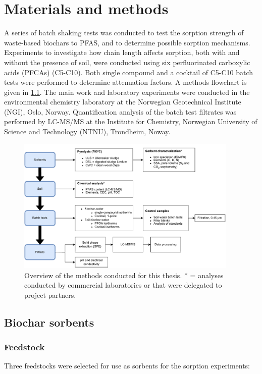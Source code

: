\chapter{Materials and methods}\label{chap:MatlsMethds}
A series of batch shaking tests was conducted to test the sorption strength of waste-based biochars to PFAS, and to determine possible sorption mechanisms. Experiments to investigate how chain length affects sorption, both with and without the presence of soil, were conducted using six perfluorinated carboxylic acids (PFCAs) (C5-C10). Both single compound and a cocktail of C5-C10 batch tests were performed to determine attenuation factors. A methods flowchart is given in \cref{fig:methodoverview}. The main work and laboratory experiments were conducted in the environmental chemistry laboratory at the Norwegian Geotechnical Institute (NGI), Oslo, Norway. Quantification analysis of the batch test filtrates was performed by LC-MS/MS at the Institute for Chemistry, Norwegian University of Science and Technology (NTNU), Trondheim, Noway.

\begin{figure}[ht]
    \centering
    \includegraphics[width=0.94\textwidth]{Diagrams/Methods-General_overview_methods.pdf}
    \caption{Overview of the methods conducted for this thesis. * = analyses conducted by commercial laboratories or that were delegated to project partners.}
    \label{fig:methodoverview}
\end{figure}

\section{Biochar sorbents}
\subsection{Feedstock}
Three feedstocks were selected for use as sorbents for the sorption experiments:


